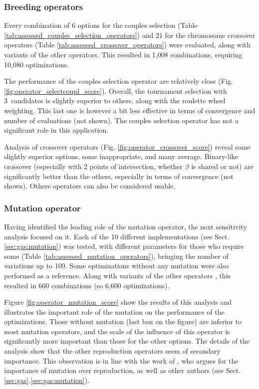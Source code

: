 \documentclass{ametsoc}
\begin{document}
\subsubsection{Breeding operators}

Every combination of 6 options for the couples selection (Table \ref{tab:assessed_couples_selection_operators}) and 21 for the chromosome crossover operators (Table \ref{tab:assessed_crossover_operators}) were evaluated, along with variants of the other operators. This resulted in 1,008 combinations, requiring 10,080 optimizations.

The performance of the couples selection operator are relatively close (Fig. \ref{fig:operator_selectcoupl_score}). Overall, the tournament selection with 3~candidates is slightly superior to others, along with the roulette wheel weighting. This last one is however a bit less effective in terms of convergence and number of evaluations (not shown). The couples selection operator has not a significant role in this application. 

Analysis of crossover operators (Fig. \ref{fig:operator_crossover_score}) reveal some slightly superior options, some inappropriate, and many average. Binary-like crossover (especially with 2 points of intersection, whether $\beta$ is shared or not) are significantly better than the others, especially in terms of convergence (not shown). Others operators can also be considered usable.
	

\subsubsection{Mutation operator}
\label{sec:assessment:mutation}

Having identified the leading role of the mutation operator, the next sensitivity analysis focused on it. Each of the 10 different implementations (see Sect. \ref{sec:gas:mutation}) was tested, with different parameters for those who require some (Table \ref{tab:assessed_mutation_operators}), bringing the number of variations up to 109. Some optimizations without any mutation were also performed as a reference. Along with variants of the other operators \citep[see][for the details]{Horton2012a}, this resulted in 660 combinations (so 6,600 optimizations).

Figure \ref{fig:operator_mutation_score} show the results of this analysis and illustrates the important role of the mutation on the performance of the optimizations. Those without mutation (last box on the figure) are inferior to most mutation operators, and the scale of the influence of this operator is significantly more important than those for the other options. The details of the analysis \citep[see][]{Horton2012a} show that the other reproduction operators seem of secondary importance. This observation is in line with the work of \citet{Back1996a}, who argues for the importance of mutation over reproduction, as well as other authors (see Sect. \ref{sec:gas}.\ref{sec:gas:mutation}).
\end{document}
